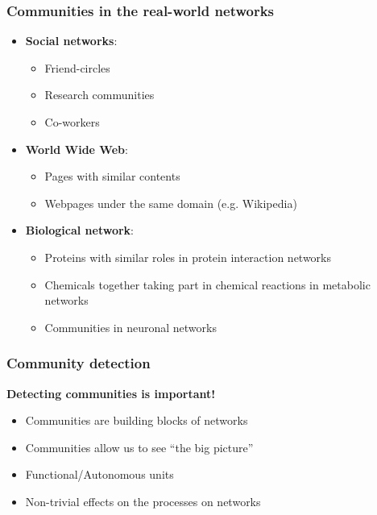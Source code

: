 \documentclass{beamer}
\begin{document}
\begin{frame}
    \frametitle{Communities in the real-world networks}
    \centering
    \begin{itemize}
    \setlength\itemsep{1em}
        \item{{\bf Social networks}: 
            \begin{itemize}
                \item{Friend-circles}
                \item{Research communities}
                \item{Co-workers}
            \end{itemize}
    }
        \item{{\bf World Wide Web}: 
            \begin{itemize}
                \item{Pages with similar contents}
                \item{Webpages under the same domain (e.g. Wikipedia)}
            \end{itemize}
    }
        \item{{\bf Biological network}:
            \begin{itemize}
                \item{Proteins with similar roles in protein interaction networks}
                \item{Chemicals together taking part in chemical reactions in metabolic networks}
                \item{Communities in neuronal networks}
            \end{itemize}
}
    \end{itemize}
\end{frame}
\begin{frame}
    \frametitle{Community detection}
    \centering
    
    {\bf Detecting communities is important!}
    \vspace{2em}
    \begin{itemize}
    \setlength\itemsep{1em}
        \item{Communities are building blocks of networks}
        \item{Communities allow us to see ``the big picture''}
        \item{Functional/Autonomous units}
        \item{Non-trivial effects on the processes on networks}
    \end{itemize}
\end{frame}
\end{document}
